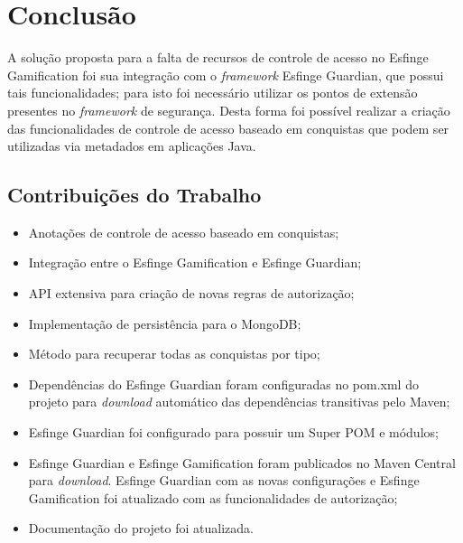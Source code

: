 \newpage
\chapter{Conclus\~ao}
\par A solução proposta para a falta de recursos de controle de acesso no Esfinge Gamification foi sua integração com o \textit{framework} Esfinge Guardian, que possui tais funcionalidades; para isto foi necessário utilizar os pontos de extensão presentes no \textit{framework} de segurança. Desta forma foi possível realizar a criação das funcionalidades de controle de acesso baseado em conquistas que podem ser utilizadas via metadados em aplicações Java.

\section{Contribuições do Trabalho}

\begin{itemize}
    \item Anotações de controle de acesso baseado em conquistas;
    \item Integração entre o Esfinge Gamification e Esfinge Guardian;
    \item API extensiva para criação de novas regras de autorização;
    \item Implementação de persistência para o MongoDB;
    \item Método para recuperar todas as conquistas por tipo;
    \item Dependências do Esfinge Guardian foram configuradas no pom.xml do projeto para \textit{download} automático das dependências transitivas pelo Maven;
    \item Esfinge Guardian foi configurado para possuir um Super POM e módulos;
    \item Esfinge Guardian e Esfinge Gamification foram publicados no Maven Central para \textit{download}. Esfinge Guardian com as novas configurações e Esfinge Gamification foi atualizado com as funcionalidades de autorização;
    \item Documentação do projeto foi atualizada.
    \end{itemize}


